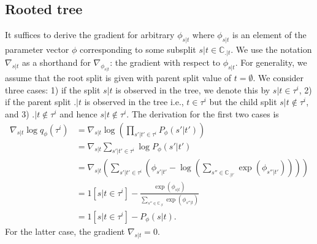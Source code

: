 \documentclass{article}
\begin{document}
\subsection*{Rooted tree}
It suffices to derive the gradient for arbitrary $\phi_{s|t}$ where $\phi_{s|t}$ is an element of the parameter vector $\phi$ corresponding to some subsplit $s|t \in \mathbb{C}_{.|t}$.
We use the notation $\nabla_{s|t}$ as a shorthand for $\nabla_{\phi_{s|t}}$: the gradient with respect to $\phi_{s|t}$.
For generality, we assume that the root split is given with parent split value of $t = \emptyset$.
We consider three cases: 1) if the split $s|t$ is observed in the tree, we denote this by $s|t \in \tau^i$, 2) if the parent split $.|t$ is observed in the tree i.e., $t \in \tau^i$ but the child split $s|t \notin \tau^i$, and 3) $.|t \notin \tau^i$ and hence $s|t \notin \tau^i$.
The derivation for the first two cases is
\begin{align*}
    \nabla_{s|t} \log q_{\phi}(\tau^i) &= \nabla_{s|t} \log \left(\prod_{s'|t' \in \tau^i} P_{\phi}(s' | t') \right) \\
    &= \nabla_{s|t} \sum\limits_{s'|t' \in \tau^i} \log P_{\phi}(s' | t') \\
    &= \nabla_{s|t} \left(\sum\limits_{s'|t' \in \tau^i} \left(\phi_{s' | t'} - \log\left(\sum\limits_{s'' \in \mathbb{C}_{.|t'}} \exp(\phi_{s''|t'})\right)\right)\right) \\
    &= 1[s|t \in \tau^{i}] - \frac{\exp(\phi_{s|t})}{\sum\limits_{s'' \in \mathbb{C}_{.|t}} \exp(\phi_{s''|t})} \\
    &= 1[s|t \in \tau^{i}] - P_{\phi}(s|t).
\end{align*}
For the latter case, the gradient $\nabla_{s|t} = 0$.
\end{document}
